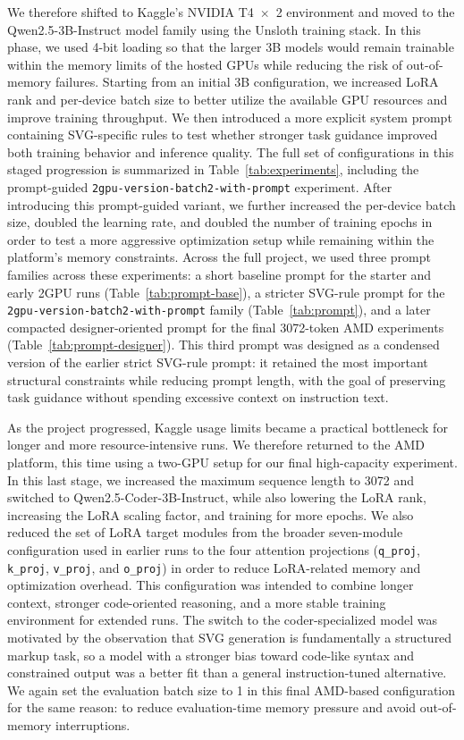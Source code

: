 \documentclass[11pt]{article}
\begin{document}
We therefore shifted to Kaggle's NVIDIA T4~$\times$~2 environment and moved to
the Qwen2.5-3B-Instruct model family using the Unsloth training stack. In this
phase, we used 4-bit loading so that the larger 3B models would remain
trainable within the memory limits of the hosted GPUs while reducing the risk
of out-of-memory failures. Starting from an initial 3B configuration, we
increased LoRA rank and per-device batch size to better utilize the available
GPU resources and improve training throughput. We then introduced a more
explicit system prompt containing SVG-specific rules to test whether stronger
task guidance improved both training behavior and inference quality. The full
set of configurations in this staged progression is summarized in
Table~\ref{tab:experiments}, including the prompt-guided
\texttt{2gpu-version-batch2-with-prompt} experiment.
After introducing this prompt-guided variant, we further increased the
per-device batch size, doubled the learning rate, and doubled the number of
training epochs in order to test a more aggressive optimization setup while
remaining within the platform's memory constraints. Across the full project,
we used three prompt families across these experiments: a short baseline
prompt for the starter and early 2GPU runs
(Table~\ref{tab:prompt-base}), a stricter SVG-rule prompt for the
\texttt{2gpu-version-batch2-with-prompt} family (Table~\ref{tab:prompt}), and
a later compacted designer-oriented prompt for the final 3072-token AMD
experiments (Table~\ref{tab:prompt-designer}). This third prompt was designed
as a condensed version of the earlier strict SVG-rule prompt: it retained the
most important structural constraints while reducing prompt length, with the
goal of preserving task guidance without spending excessive context on
instruction text.

As the project progressed, Kaggle usage limits became a practical bottleneck
for longer and more resource-intensive runs. We therefore returned to the AMD
platform, this time using a two-GPU setup for our final high-capacity
experiment. In this last stage, we increased the maximum sequence length to
3072 and switched to Qwen2.5-Coder-3B-Instruct, while also lowering the LoRA
rank, increasing the LoRA scaling factor, and training for more epochs. We
also reduced the set of LoRA target modules from the broader seven-module
configuration used in earlier runs to the four attention projections
(\texttt{q\_proj}, \texttt{k\_proj}, \texttt{v\_proj}, and
\texttt{o\_proj}) in order to reduce LoRA-related memory and optimization
overhead. This configuration was intended to combine longer context, stronger
code-oriented reasoning, and a more stable training environment for extended
runs. The switch to the coder-specialized model was motivated by the
observation that SVG generation is fundamentally a structured markup task, so
a model with a stronger bias toward code-like syntax and constrained output
was a better fit than a general instruction-tuned alternative. We again set
the evaluation batch size to 1 in this final AMD-based configuration for the
same reason: to reduce evaluation-time memory pressure and avoid
out-of-memory interruptions.
\end{document}
